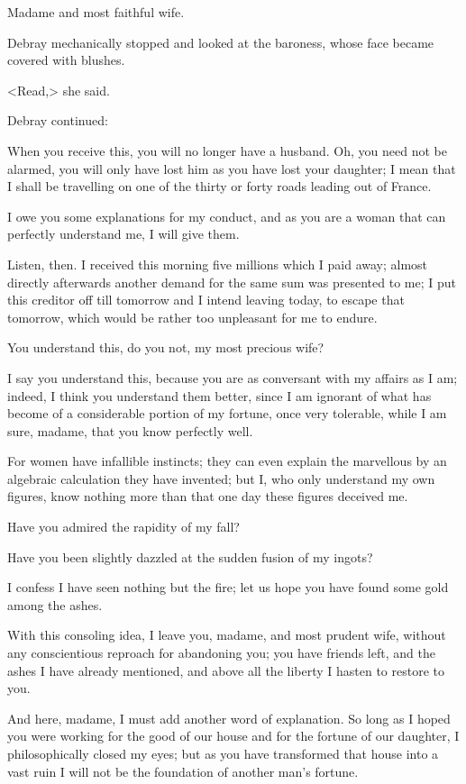 \begin{mail}{}{Madame and most faithful wife.}
	\pausemail

 Debray mechanically stopped and looked at the baroness, whose face became covered with blushes. 

 <Read,> she said. 

 Debray continued: 
 \resumemail

When you receive this, you will no longer have a husband. Oh, you need not be alarmed, you will only have lost him as you have lost your daughter; I mean that I shall be travelling on one of the thirty or forty roads leading out of France. 

I owe you some explanations for my conduct, and as you are a woman that can perfectly understand me, I will give them. 

Listen, then. I received this morning five millions which I paid away; almost directly afterwards another demand for the same sum was presented to me; I put this creditor off till tomorrow and I intend leaving today, to escape that tomorrow, which would be rather too unpleasant for me to endure. 

You understand this, do you not, my most precious wife? 

I say you understand this, because you are as conversant with my affairs as I am; indeed, I think you understand them better, since I am ignorant of what has become of a considerable portion of my fortune, once very tolerable, while I am sure, madame, that you know perfectly well. 

For women have infallible instincts; they can even explain the marvellous by an algebraic calculation they have invented; but I, who only understand my own figures, know nothing more than that one day these figures deceived me. 

Have you admired the rapidity of my fall? 

Have you been slightly dazzled at the sudden fusion of my ingots? 

I confess I have seen nothing but the fire; let us hope you have found some gold among the ashes. 

With this consoling idea, I leave you, madame, and most prudent wife, without any conscientious reproach for abandoning you; you have friends left, and the ashes I have already mentioned, and above all the liberty I hasten to restore to you. 

And here, madame, I must add another word of explanation. So long as I hoped you were working for the good of our house and for the fortune of our daughter, I philosophically closed my eyes; but as you have transformed that house into a vast ruin I will not be the foundation of another man's fortune. 


\end{mail}
